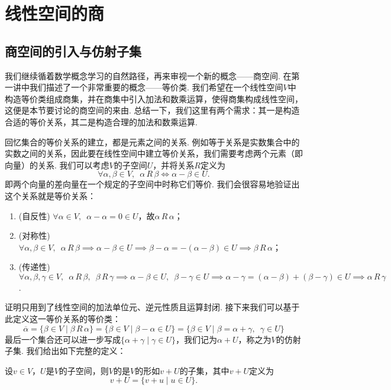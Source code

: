 \section{线性空间的商}

\subsection{商空间的引入与仿射子集}

我们继续循着数学概念学习的自然路径，再来审视一个新的概念——商空间. 在第一讲中我们描述了一个非常重要的概念——等价类. 我们希望在一个线性空间$V$中构造等价类组成商集，并在商集中引入加法和数乘运算，使得商集构成线性空间，这便是本节要讨论的商空间的来由. 总结一下，我们这里有两个需求：其一是构造合适的等价关系，其二是构造合理的加法和数乘运算.

回忆集合的等价关系的建立，都是元素之间的关系. 例如等于关系是实数集合中的实数之间的关系，因此要在线性空间中建立等价关系，我们需要考虑两个元素（即向量）的关系. 我们可以考虑$V$的子空间$U$，并将关系$R$定义为
\[\forall\alpha,\beta\in V,\enspace\alpha\,R\,\beta\iff \alpha-\beta\in U.\]
即两个向量的差向量在一个规定的子空间中时称它们等价. 我们会很容易地验证出这个关系就是等价关系：
\begin{enumerate}
    \item (自反性) $\forall \alpha\in V,\enspace\alpha-\alpha=0\in U$，故$\alpha\,R\,\alpha$；

    \item (对称性) $\forall \alpha,\beta\in V,\enspace\alpha\,R\,\beta\implies \alpha-\beta\in U\implies \beta-\alpha=-(\alpha-\beta)\in U\implies \beta\,R\,\alpha$；

    \item (传递性) $\forall \alpha,\beta,\gamma\in V,\enspace\alpha\,R\,\beta,\enspace\beta\,R\,\gamma\implies \alpha-\beta\in U,\enspace\beta-\gamma\in U\implies \alpha-\gamma=(\alpha-\beta)+(\beta-\gamma)\in U\implies \alpha\,R\,\gamma$.
\end{enumerate}
证明只用到了线性空间的加法单位元、逆元性质且运算封闭. 接下来我们可以基于此定义这一等价关系的等价类：
\[\overline{\alpha}=\{\beta\in V \mid \beta\,R\,\alpha\}=\{\beta\in V \mid \beta-\alpha\in U\}=\{\beta\in V \mid \beta=\alpha+\gamma,\enspace\gamma\in U\}\]
最后一个集合还可以进一步写成$\{\alpha+\gamma \mid \gamma\in U\}$，我们记为$\alpha+U$，称之为$V$的仿射子集. 我们给出如下完整的定义：
\begin{definition}[仿射子集] 
    设$v\in V$，$U$是$V$的子空间，则$V$的是$V$的形如$v+U$的子集，其中$v+U$定义为
    \[v+U=\{v+u \mid u\in U\}.\]
\end{definition}
